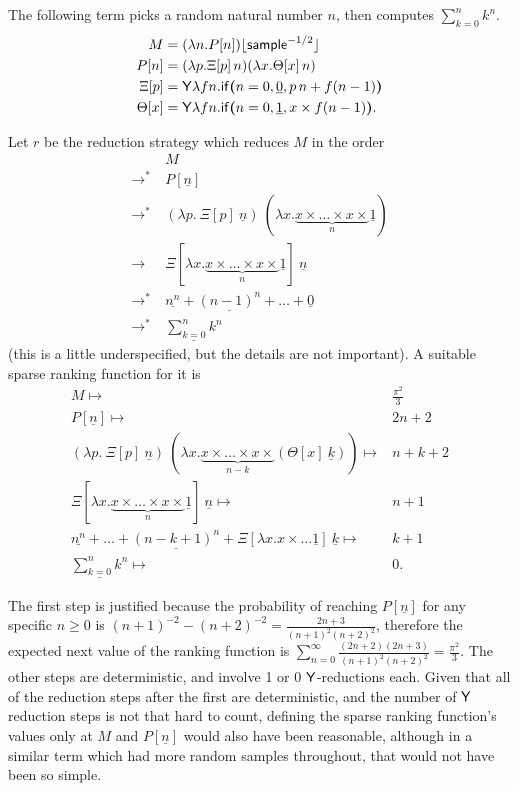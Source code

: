 \begin{example} \label{ex:sum of powers}
The following term picks a random natural number $n$, then computes $\sum_{k=0}^n k^n$.
\begin{align*}
M  &= (\lambda n. P[n]) \lfloor \mathsf{sample}^{-1/2} \rfloor \\
P[n]  &= (\lambda p. \Xi[p] \, n) (\lambda x. \Theta[x] \, n) \\
\Xi[p]  &= \mathsf{Y} \lambda f n. \mathsf{if}\boldsymbol{(}n = 0, \underline 0, p \, n + f (n-1)\boldsymbol{)} \\
\Theta[x]  &= \mathsf{Y} \lambda f n. \mathsf{if}\boldsymbol{(}n = 0, \underline 1, x \times f (n-1)\boldsymbol{)}.
\end{align*}

Let $r$ be the reduction strategy which reduces $M$ in the order
\begin{align*}
&\ M \\
\to^* &\ P[\underline n] \\
\to^* &\ (\lambda p.\ \Xi[p]\ \underline n)\ (\lambda x. \underbrace{x \times \dots \times x \times}_n \underline 1) \\
\to^{\phantom *} &\ \Xi[\lambda x. \underbrace{x \times \dots \times x \times}_n \underline 1]\ \underline n \\
\to^* &\ \underline{n^n} + \underline{(n-1)^n} + \dots + \underline 0 \\
\to^* &\ \underline{\sum_{k=0}^n k^n}
\end{align*}
(this is a little underspecified, but the details are not important). A suitable sparse ranking function for it is
\begin{align*}
M \mapsto & \frac{\pi^2}{3} \\
P[\underline n] \mapsto & 2n+2 \\
(\lambda p.\ \Xi[p]\ \underline n)\ (\lambda x. \underbrace{x \times \dots \times x \times}_{n-k} (\Theta[x]\ \underline k)) \mapsto & n + k + 2 \\
\Xi[\lambda x. \underbrace{x \times \dots \times x \times}_n \underline 1]\ \underline n \mapsto & n + 1 \\
\underline{n^n} + \dots + \underline{(n-k+1)^n} + \Xi[\lambda x. x \times \dots \underline 1]\ \underline k \mapsto & k + 1 \\
\underline{\sum_{k=0}^n k^n} \mapsto & 0.
\end{align*}

The first step is justified because the probability of reaching $P[\underline n]$ for any specific $n \geq 0$ is $(n+1)^{-2} - (n+2)^{-2} = \frac{2n + 3}{(n+1)^2(n+2)^2}$, therefore the expected next value of the ranking function is $\sum_{n=0}^{\infty} \frac{(2n+2)(2n + 3)}{(n+1)^2(n+2)^2} = \frac{\pi^2}{3}$. The other steps are deterministic, and involve 1 or 0 $\mathsf{Y}$-reductions each. Given that all of the reduction steps after the first are deterministic, and the number of $\mathsf{Y}$ reduction steps is not that hard to count, defining the sparse ranking function's values only at $M$ and $P[\underline n]$ would also have been reasonable, although in a similar term which had more random samples throughout, that would not have been so simple.


\end{example}
